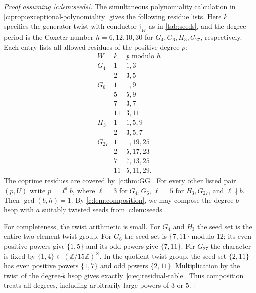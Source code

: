 \documentclass[10pt,a4paper]{amsart}
\theoremstyle{definition}
\newcommand{\Z}{\mathbb Z}\newcommand{\N}{\mathbb Z_{\ge0}}
\begin{document}
\begin{proof}[Proof assuming \cref{c:lem:seeds}]
The simultaneous polynomiality calculation in \cref{c:prop:exceptional-polynomiality}
gives the following residue lists. Here $k$
specifies the generator twist with conductor $\mathfrak f_W$ as in
\cref{tab:seeds}, and the degree period is the Coxeter number
$h=6,12,10,30$ for $G_4,G_6,H_3,G_{27}$, respectively.
Each entry lists all allowed residues of the positive degree $p$:
\begin{equation}\label{c:eq:residual-table}
\begin{array}{c|c|l}
 W&k& p\text{ modulo }h\\\hline
 G_4&1&1,3\\
    &2&3,5\\\hline
 G_6&1&1,9\\
    &5&5,9\\
    &7&3,7\\
    &11&3,11\\\hline
 H_3&1&1,5,9\\
    &2&3,5,7\\\hline
 G_{27}&1&1,19,25\\
       &2&5,17,23\\
       &7&7,13,25\\
       &11&5,11,29.
\end{array}
\end{equation}
The coprime residues are covered by~\cref{c:thm:GG}. For every other
listed pair $(p,U)$ write $p=\ell^a b$, where $\ell=3$ for $G_4,G_6$,
$\ell=5$ for $H_3,G_{27}$, and $\ell\nmid b$. Then $\gcd(b,h)=1$.
By \cref{c:lem:composition}, we may compose the degree-$b$ hsop
with $a$ suitably twisted seeds from \cref{c:lem:seeds}.

For completeness, the twist arithmetic is small. For $G_4$ and $H_3$
the seed set is the entire two-element twist group. For $G_6$ the seed
set is $\{7,11\}$ modulo $12$; its even positive powers give $\{1,5\}$
and its odd powers give $\{7,11\}$. For $G_{27}$ the character is fixed
by $\{1,4\}\subset(\Z/15\Z)^\times$. In the quotient twist group,
the seed set $\{2,11\}$ has even positive powers $\{1,7\}$ and odd
powers $\{2,11\}$. Multiplication by the twist of the degree-$b$ hsop
gives exactly~\cref{c:eq:residual-table}.
Thus composition treats all degrees, including arbitrarily large powers
of $3$ or $5$.
\end{proof}
\end{document}
